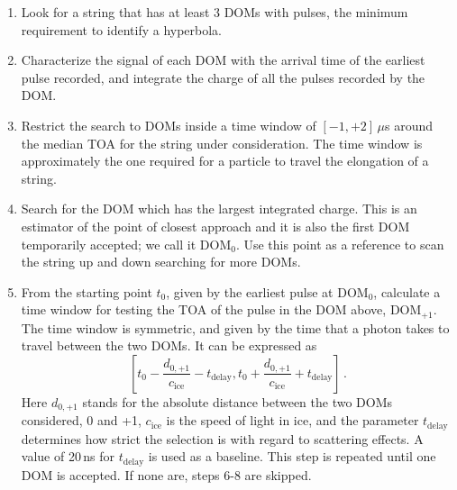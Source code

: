 \documentclass[../Main.tex]{subfiles}
\begin{document}
\begin{enumerate}
\item Look for a string that has at least 3 DOMs with pulses, the minimum requirement to identify a hyperbola.
\item Characterize the signal of each DOM with the arrival time of the earliest pulse recorded, and integrate the charge of all the pulses recorded by the DOM.
\item Restrict the search to DOMs inside a time window of $[-1,+2]$\,$\mu$s around the median TOA for the string under consideration. The time window is approximately the one required for a particle to travel the elongation of a string.
\item Search for the DOM which has the largest integrated charge. This is an estimator of the point of closest approach and it is also the first DOM temporarily accepted; we call it DOM$_0$. Use this point as a reference to scan the string up and down searching for more DOMs.

\item From the starting point $t_0$, given by the earliest pulse at DOM$_0$, calculate a time window for testing the TOA of the pulse in the DOM above, DOM$_{+1}$. The time window is symmetric, and given by the time that a photon takes to travel between the two DOMs. It can be expressed as
  \begin{equation}
    \left[t_0 - \frac{d_\mathrm{0,+1}}{c_\mathrm{ice}} - t_\mathrm{delay}, t_0 + \frac{d_\mathrm{0,+1}}{c_\mathrm{ice}} + t_\mathrm{delay}\right]\,.
  \end{equation}
Here $d_\mathrm{0,+1}$ stands for the absolute distance between the two DOMs considered, 0 and +1, $c_\mathrm{ice}$ is the speed of light in ice, and the parameter $t_\mathrm{delay}$ determines how strict the selection is with regard to scattering effects. A value of 20\,ns for $t_\mathrm{delay}$ is used as a baseline. This step is repeated until one DOM is accepted. If none are, steps 6-8 are skipped.


\end{enumerate}
\end{document}
